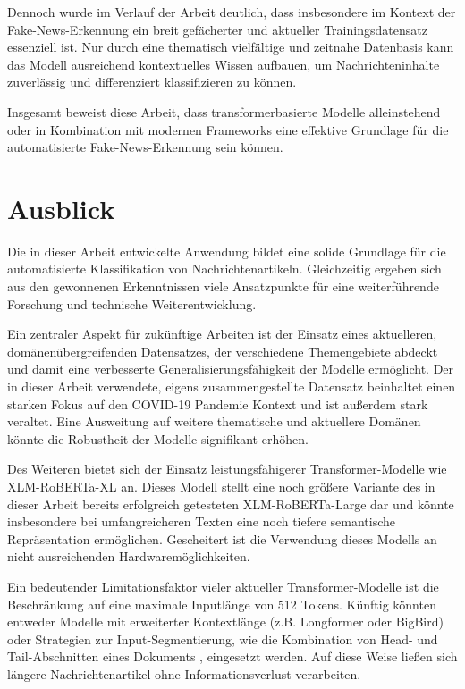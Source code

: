 Dennoch wurde im Verlauf der Arbeit deutlich, dass insbesondere im Kontext der Fake-News-Erkennung ein breit gefächerter und aktueller Trainingsdatensatz essenziell ist.
Nur durch eine thematisch vielfältige und zeitnahe Datenbasis kann das Modell ausreichend kontextuelles Wissen aufbauen, um Nachrichteninhalte zuverlässig und differenziert 
klassifizieren zu können.

Insgesamt beweist diese Arbeit, dass transformerbasierte Modelle alleinstehend oder in Kombination mit modernen Frameworks eine effektive Grundlage 
für die automatisierte Fake-News-Erkennung sein können.

\chapter{Ausblick}
\label{chap:ausblick}

Die in dieser Arbeit entwickelte Anwendung bildet eine solide Grundlage für die automatisierte Klassifikation von Nachrichtenartikeln. 
Gleichzeitig ergeben sich aus den gewonnenen Erkenntnissen viele Ansatzpunkte für eine weiterführende Forschung und technische Weiterentwicklung.

Ein zentraler Aspekt für zukünftige Arbeiten ist der Einsatz eines aktuelleren, domänenübergreifenden Datensatzes, der verschiedene Themengebiete abdeckt 
und damit eine verbesserte Generalisierungsfähigkeit der Modelle ermöglicht. Der in dieser Arbeit verwendete, eigens zusammengestellte Datensatz 
beinhaltet einen starken Fokus auf den COVID-19 Pandemie Kontext und ist außerdem stark veraltet. 
Eine Ausweitung auf weitere thematische und aktuellere Domänen könnte die Robustheit der Modelle signifikant erhöhen.

Des Weiteren bietet sich der Einsatz leistungsfähigerer Transformer-Modelle wie XLM-RoBERTa-XL an. Dieses Modell stellt eine noch größere Variante des in 
dieser Arbeit bereits erfolgreich getesteten XLM-RoBERTa-Large dar und könnte insbesondere bei umfangreicheren Texten eine noch tiefere semantische 
Repräsentation ermöglichen. Gescheitert ist die Verwendung dieses Modells an nicht ausreichenden Hardwaremöglichkeiten.

Ein bedeutender Limitationsfaktor vieler aktueller Transformer-Modelle ist die Beschränkung auf eine maximale Inputlänge von 512 Tokens. 
Künftig könnten entweder Modelle mit erweiterter Kontextlänge (z.B. Longformer oder BigBird) oder Strategien zur Input-Segmentierung, 
wie die Kombination von Head- und Tail-Abschnitten eines Dokuments \cite{sun2020finetuneberttextclassification}, eingesetzt werden. 
Auf diese Weise ließen sich längere Nachrichtenartikel ohne Informationsverlust verarbeiten.

